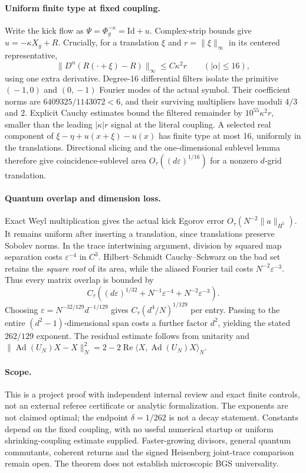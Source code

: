 \paragraph{Uniform finite type at fixed coupling.}
Write the kick flow as $\Psi=\Phi_g^{-\kappa}=\mathrm{Id}+u$.
Complex-strip bounds give $u=-\kappa X_g+R$. Crucially, for a translation
$\xi$ and $r=\|\xi\|_\infty$ in its centered representative,
\[
 \|D^\alpha(R(\cdot+\xi)-R)\|_\infty
 \le C\kappa^2 r \qquad (|\alpha|\le16),
\]
using one extra derivative. Degree-16 differential filters isolate the
primitive $(\!-1,0)$ and $(0,\!-1)$ Fourier modes of the actual symbol.
Their coefficient norms are $6409325/1143072<6$, and their surviving
multipliers have moduli $4/3$ and $2$. Explicit Cauchy estimates bound the
filtered remainder by $10^{55}\kappa^2r$, smaller than the leading
$|\kappa|r$ signal at the literal coupling. A selected real component of
$\xi-\eta+u(x+\xi)-u(x)$ has finite type at most 16, uniformly in the
translations. Directional slicing and the one-dimensional sublevel lemma
therefore give coincidence-sublevel area
$O_\tau((d\varepsilon)^{1/16})$ for a nonzero $d$-grid translation.

\paragraph{Quantum overlap and dimension loss.}
Exact Weyl multiplication gives the actual kick Egorov error
$O_\tau(N^{-2}\|a\|_{H^5})$. It remains uniform after inserting a
translation, since translations preserve Sobolev norms. In the trace
intertwining argument, division by squared map separation costs
$\varepsilon^{-4}$ in $C^3$. Hilbert--Schmidt Cauchy--Schwarz on the bad
set retains the \emph{square root} of its area, while the aliased Fourier
tail costs $N^{-2}\varepsilon^{-3}$. Thus every matrix overlap is bounded
by
\[
 C_\tau\left((d\varepsilon)^{1/32}
       +N^{-1}\varepsilon^{-4}+N^{-2}\varepsilon^{-3}\right).
\]
Choosing $\varepsilon=N^{-32/129}d^{-1/129}$ gives
$C_\tau(d^4/N)^{1/129}$ per entry. Passing to the entire
$(d^2-1)$-dimensional span costs a further factor $d^2$, yielding the
stated $262/129$ exponent. The residual estimate follows from unitarity
and $\|\operatorname{Ad}(U_N)X-X\|_N^2
=2-2\operatorname{Re}\langle X,\operatorname{Ad}(U_N)X\rangle_N$.

\paragraph{Scope.}
This is a project proof with independent internal review and exact finite
controls, not an external referee certificate or analytic formalization.
The exponents are not claimed optimal; the endpoint $\delta=1/262$ is not
a decay statement. Constants depend on the fixed coupling, with no useful
numerical startup or uniform shrinking-coupling estimate supplied.
Faster-growing divisors, general quantum commutants, coherent returns and
the signed Heisenberg joint-trace comparison remain open. The theorem
does not establish microscopic BGS universality.
